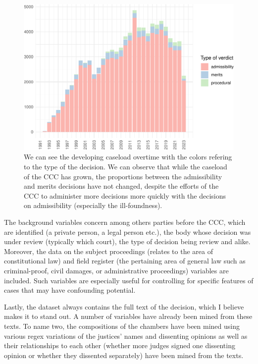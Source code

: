 \documentclass[
  11pt,
]{article}
\begin{document}
\begin{figure}
\centering
\includegraphics{The_Czech_Constitutional_Court_Dataset_files/figure-latex/caseload-1.pdf}
\caption{We can see the developing caseload overtime with the colors
refering to the type of the decision. We can observe that while the
caseload of the CCC has grown, the proportions between the admissibility
and merits decisions have not changed, despite the efforts of the CCC to
administer more decisions more quickly with the decisions on
admissibility (especially the ill-foundness).}
\end{figure}

The background variables concern among others parties before the CCC,
which are identified (a private person, a legal person etc.), the body
whose decision was under review (typically which court), the type of
decision being review and alike. Moreover, the data on the subject
proceedings (relates to the area of constitutional law) and field
register (the pertaining area of general law such as criminal-proof,
civil damages, or administrative proceedings) variables are included.
Such variables are especially useful for controlling for specific
features of cases that may have confounding potential.

Lastly, the dataset always contains the full text of the decision, which
I believe makes it to stand out. A number of variables have already been
mined from these texts. To name two, the compositions of the chambers
have been mined using various regex variations of the justices' names
and dissenting opinions as well as their relationships to each other
(whether more judges signed one dissenting opinion or whether they
dissented separately) have been mined from the texts.
\end{document}
